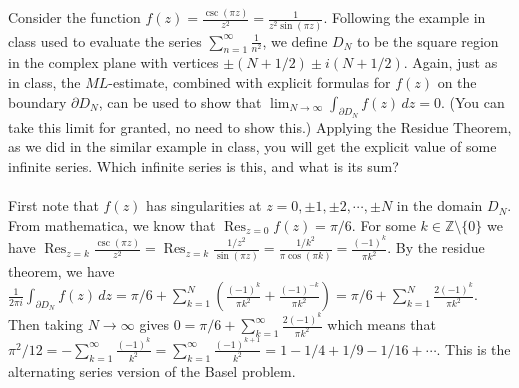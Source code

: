\documentclass[11pt]{exam}
\newcommand{\Z}{\mathbb{Z}}
\newcommand{\ds}{\displaystyle}
\DeclareMathOperator*{\Res}{Res}
\begin{document}
\begin{questions}

  \question Consider the function $\ds f(z) = \frac{\csc (\pi z)}{z^2}
  = \frac{1}{z^2 \sin (\pi z)}$. Following the example in class used
  to evaluate the series $\ds \sum_{n=1}^\infty \frac{1}{n^2}$, we
  define $D_N$ to be the square region in the complex plane with
  vertices $\pm (N+1/2) \pm i (N+1/2)$. Again, just as in class, the
  $ML$-estimate, combined with explicit formulas for $f(z)$ on the
  boundary $\partial D_N$, can be used to show that $\ds
  \lim_{N\to\infty} \int_{\partial D_N} f(z) \, dz = 0$. (You can take
  this limit for granted, no need to show this.) Applying the Residue
  Theorem, as we did in the similar example in class, you will get the
  explicit value of some infinite series. Which infinite series is this,
  and what is its sum? \\\\
  First note that $f(z)$ has singularities at $z = 0, \pm 1, \pm 2, \cdots, \pm N $ in the domain $D_N$.
  From mathematica, we know that $\Res_{z=0} f(z) = \pi / 6$.
  For some $k \in \Z \setminus \{ 0 \}$ we have
  $\ds \Res_{z=k} \frac{ \csc (\pi z)}{z^2} = \Res_{z=k} \frac{1/z^2}{\sin (\pi z)} = \frac{1/k^2}{\pi \cos (\pi k)} = \frac{(-1)^k}{\pi k^2}$.
  By the residue theorem, we have $ \ds \frac{1}{2 \pi i} \int_{\partial D_N} f(z) \, dz = \pi / 6 + \sum_{k=1}^N \left( \frac{(-1)^k}{\pi k^2} + \frac{(-1)^{-k}}{\pi k^2} \right) = \pi /6 + \sum_{k=1}^N \frac{2(-1)^k}{\pi k^2} $.
  Then taking $N \to \infty$ gives $ \ds 0 = \pi / 6 + \sum_{k=1}^\infty \frac{2(-1)^k}{\pi k^2}$ which means that $\ds \pi ^2 / 12 = - \sum_{k=1}^\infty \frac{(-1)^k}{k^2} = \sum_{k=1}^\infty \frac{(-1)^{k+1}}{k^2} = 1 - 1/4 + 1/9 - 1/16 + \cdots $.
  This is the alternating series version of the Basel problem.
\end{questions}
\end{document}

